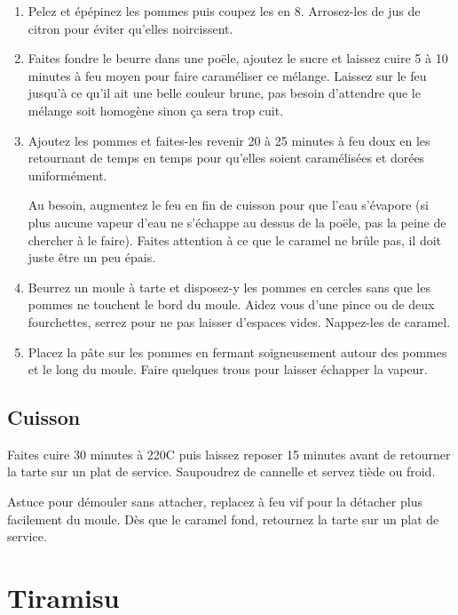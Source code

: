 \begin{enumerate}
\item Pelez et épépinez les pommes puis coupez les en 8. Arrosez-les de jus de citron pour éviter qu'elles noircissent.
\item Faites fondre le beurre dans une poële, ajoutez le sucre et laissez cuire 5 à 10 minutes à feu moyen pour faire caraméliser ce mélange. Laissez sur le feu jusqu'à ce qu'il ait une belle couleur brune, pas besoin d'attendre que le mélange soit homogène sinon ça sera trop cuit. 
\item Ajoutez les pommes et faites-les revenir 20 à 25 minutes à feu doux en les retournant de temps en temps pour qu'elles soient caramélisées et dorées uniformément.
\begin{remarque}
Au besoin, augmentez le feu en fin de cuisson pour que l'eau s'évapore (si plus aucune vapeur d'eau ne s'échappe au dessus de la poële, pas la peine de chercher à le faire). Faites attention à ce que le caramel ne brûle pas, il doit juste être un peu épais. 
\end{remarque}

\item Beurrez un moule à tarte et disposez-y les pommes en cercles sans que les pommes ne touchent le bord du moule. Aidez vous d'une pince ou de deux fourchettes, serrez pour ne pas laisser d'espaces vides. Nappez-les de caramel. 
\item Placez la pâte sur les pommes en fermant soigneusement autour des pommes et le long du moule. Faire quelques trous pour laisser échapper la vapeur.
\end{enumerate}

\subsection*{Cuisson}
Faites cuire 30 minutes à 220\degres C puis laissez reposer 15 minutes avant de retourner la tarte sur un plat de service. Saupoudrez de cannelle et servez tiède ou froid.

\begin{remarque}
Astuce pour démouler sans attacher, replacez à feu vif pour la détacher plus facilement du moule. Dès que le caramel fond, retournez la tarte sur un plat de service.
\end{remarque}

\newpage
\section{Tiramisu}

